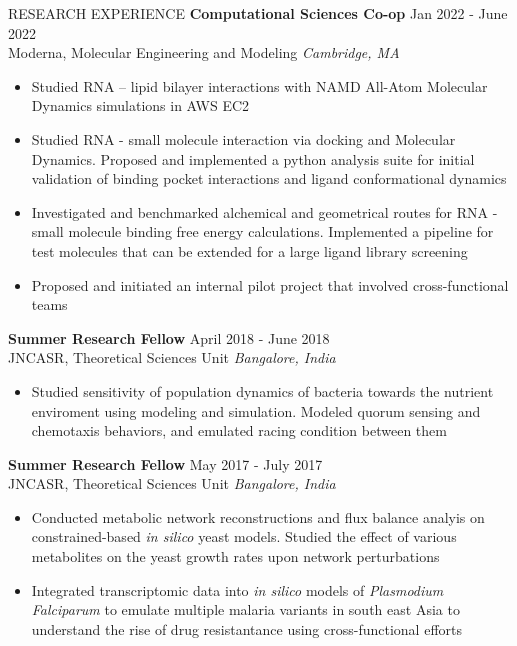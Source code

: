 \documentclass{resume} %
\begin{document}
\begin{rSection}{RESEARCH EXPERIENCE}
\textbf{Computational Sciences Co-op} \hfill Jan 2022 - June 2022\\
Moderna, Molecular Engineering and Modeling \hfill \textit{Cambridge, MA}
 \begin{itemize}
    \itemsep -3pt {} 
     \item Studied RNA – lipid bilayer interactions with NAMD All-Atom Molecular Dynamics simulations in AWS EC2
     \item Studied RNA - small molecule interaction via docking and Molecular Dynamics. Proposed and implemented a python analysis suite for initial validation of binding pocket interactions and ligand conformational dynamics
     \item Investigated and benchmarked alchemical and geometrical routes for RNA - small molecule binding free energy calculations. Implemented a pipeline for test molecules that can be extended for a large ligand library screening
    \item  Proposed and initiated an internal pilot project that involved cross-functional teams
 \end{itemize}

 \textbf{Summer Research Fellow} \hfill April 2018 - June 2018\\
JNCASR, Theoretical Sciences Unit \hfill \textit{Bangalore, India}
 \begin{itemize}
    \itemsep -3pt {} 
     \item Studied sensitivity of population dynamics of bacteria towards the nutrient enviroment using modeling and simulation. Modeled quorum sensing and chemotaxis behaviors, and emulated racing condition between them
 \end{itemize}

 \textbf{Summer Research Fellow} \hfill May 2017 - July 2017\\
JNCASR, Theoretical Sciences Unit \hfill \textit{Bangalore, India}
 \begin{itemize}
    \itemsep -3pt {} 
     \item Conducted metabolic network reconstructions and flux balance analyis on constrained-based \textit{in silico} yeast models. Studied the effect of various metabolites on the yeast growth rates upon network perturbations
     \item Integrated transcriptomic data into \textit{in silico} models of \textit{Plasmodium Falciparum} to emulate multiple malaria variants in south east Asia to understand the rise of drug resistantance using cross-functional efforts
 \end{itemize}

\end{rSection} 
\end{document}
